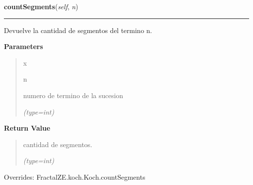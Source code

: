 \hspace{.8\funcindent}\begin{boxedminipage}{\funcwidth}

    \raggedright \textbf{countSegments}(\textit{self}, \textit{n})

    \vspace{-1.5ex}

    \rule{\textwidth}{0.5\fboxrule}
\setlength{\parskip}{2ex}
    Devuelve la cantidad de segmentos del termino n.

\setlength{\parskip}{1ex}
      \textbf{Parameters}
      \vspace{-1ex}

      \begin{quote}
        \begin{Ventry}{x}

          \item[n]

          numero de termino de la sucesion

            {\it (type=int)}

        \end{Ventry}

      \end{quote}

      \textbf{Return Value}
    \vspace{-1ex}

      \begin{quote}
      cantidad de segmentos.

      {\it (type=int)}

      \end{quote}

      Overrides: FractalZE.koch.Koch.countSegments

    \end{boxedminipage}

    \vspace{0.5ex}

